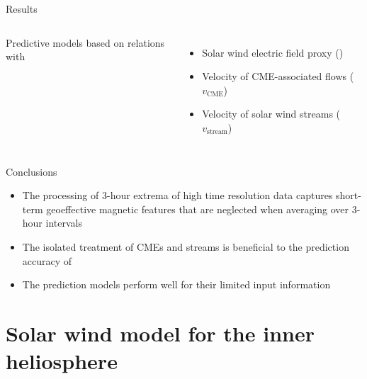 \begin{frame}[plain,c]{Results}{}
	\begin{columns}[c]
	\column{\textwidth}
		
		Predictive \Kp{} models based on relations with
		\begin{itemize}%
			\item Solar wind electric field proxy (\vBz{})
			\item Velocity of CME-associated flows ($v_\text{CME}$)
			\item Velocity of solar wind streams ($v_\text{stream}$)
		\end{itemize}
		
	\end{columns}
\end{frame}
\begin{frame}[plain,c]{Conclusions}{}
		
		\begin{itemize}%
			\item The processing of 3-hour extrema of high time resolution data captures short-term geoeffective magnetic features that are neglected when averaging over 3-hour intervals
			\item The isolated treatment of CMEs and streams is beneficial to the prediction accuracy of \Kp{}
			\item The prediction models perform well for their limited input information
		\end{itemize}
		
	
	\vspace*{\fill} \hfill \hyperlink{prediction_performance}{}
\end{frame}


\section{Solar wind model for the inner heliosphere}

